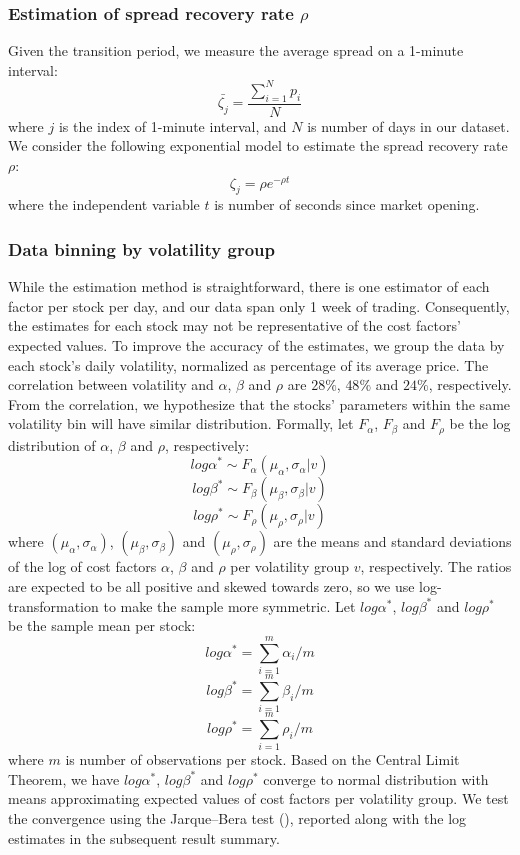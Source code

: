 \subsubsection{Estimation of spread recovery rate $\rho$}

Given the transition period, we measure the average spread on a 1-minute interval:
\[
  \bar{\zeta_j} = \frac{\sum_{i=1}^N p_i}{N}
\]
where $j$ is the index of 1-minute interval, and $N$ is number of days in our dataset. We consider the following exponential model to estimate the spread recovery rate $\rho$:
\[
  \zeta_j = \rho e^{-\rho t}
\]
where the independent variable $t$ is number of seconds since market opening.

\subsubsection{Data binning by volatility group}

While the estimation method is straightforward, there is one estimator of each factor per stock per day, and our data span only 1 week of trading. Consequently, the estimates for each stock may not be representative of the cost factors' expected values. To improve the accuracy of the estimates, we group the data by each stock's daily volatility, normalized as percentage of its average price. The correlation between volatility and $\alpha$, $\beta$ and $\rho$ are $28\%$, $48\%$ and $24\%$, respectively. From the correlation, we hypothesize that the stocks' parameters within the same volatility bin will have similar distribution. Formally, let $F_\alpha$, $F_\beta$ and $F_\rho$ be the log distribution of $\alpha$, $\beta$ and $\rho$, respectively:
\[
  log \alpha^* \sim F_\alpha(\mu_\alpha,\sigma_\alpha|v)
\]
\[
  log \beta^* \sim F_\beta(\mu_\beta,\sigma_\beta|v)
\]
\[
  log \rho^* \sim F_\rho(\mu_\rho,\sigma_\rho|v)
\]
where $(\mu_\alpha,\sigma_\alpha)$, $(\mu_\beta,\sigma_\beta)$ and $(\mu_\rho,\sigma_\rho)$ are the means and standard deviations of the log of cost factors $\alpha$, $\beta$ and $\rho$ per volatility group $v$, respectively. The ratios are expected to be all positive and skewed towards zero, so we use log-transformation to make the sample more symmetric. Let $log \alpha^*$, $log \beta^*$ and $log \rho^*$ be the sample mean per stock:
\[
  log \alpha^* = \sum_{i=1}^m \alpha_i/m
\]
\[
  log \beta^* = \sum_{i=1}^m \beta_i/m
\]
\[
  log \rho^* = \sum_{i=1}^m \rho_i/m
\]
where $m$ is number of observations per stock. Based on the Central Limit Theorem, we have $log \alpha^*$, $log \beta^*$ and $log \rho^*$ converge to normal distribution with means approximating expected values of cost factors per volatility group. We test the convergence using the Jarque–Bera test (\cite{JarqueBera1980}), reported along with the log estimates in the subsequent result summary.

